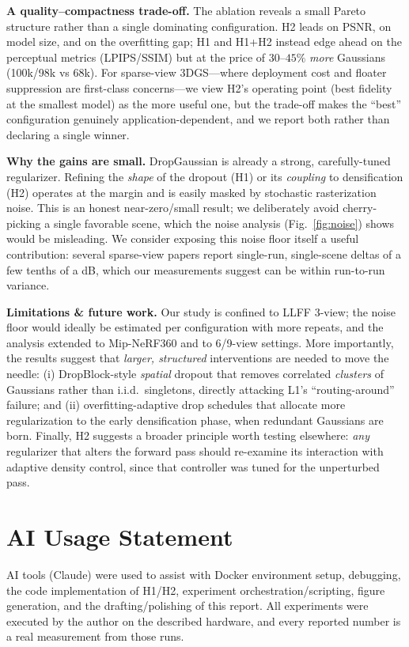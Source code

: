 \documentclass[conference]{IEEEtran}
\begin{document}
\textbf{A quality--compactness trade-off.} The ablation reveals a small Pareto
structure rather than a single dominating configuration. H2 leads on PSNR, on model
size, and on the overfitting gap; H1 and H1+H2 instead edge ahead on the perceptual
metrics (LPIPS/SSIM) but at the price of $30$--$45\%$ \emph{more} Gaussians (100k/98k vs
68k). For sparse-view 3DGS---where deployment cost and floater suppression are first-class
concerns---we view H2's operating point (best fidelity at the smallest model) as the more
useful one, but the trade-off makes the ``best'' configuration genuinely
application-dependent, and we report both rather than declaring a single winner.

\textbf{Why the gains are small.} DropGaussian is already a strong, carefully-tuned
regularizer. Refining the \emph{shape} of the dropout (H1) or its \emph{coupling} to
densification (H2) operates at the margin and is easily masked by stochastic
rasterization noise. This is an honest near-zero/small result; we deliberately avoid
cherry-picking a single favorable scene, which the noise analysis (Fig.~\ref{fig:noise})
shows would be misleading. We consider exposing this noise floor itself a useful
contribution: several sparse-view papers report single-run, single-scene deltas of a
few tenths of a dB, which our measurements suggest can be within run-to-run variance.

\textbf{Limitations \& future work.} Our study is confined to LLFF 3-view; the noise
floor would ideally be estimated per configuration with more repeats, and the analysis
extended to Mip-NeRF360 and to 6/9-view settings. More importantly, the results suggest
that \emph{larger, structured} interventions are needed to move the needle: (i)
DropBlock-style \emph{spatial} dropout that removes correlated \emph{clusters} of
Gaussians rather than i.i.d.\ singletons, directly attacking L1's ``routing-around''
failure; and (ii) overfitting-adaptive drop schedules that allocate more regularization
to the early densification phase, when redundant Gaussians are born. Finally, H2
suggests a broader principle worth testing elsewhere: \emph{any} regularizer that
alters the forward pass should re-examine its interaction with adaptive density
control, since that controller was tuned for the unperturbed pass.

\section*{AI Usage Statement}
AI tools (Claude) were used to assist with Docker environment setup, debugging, the
code implementation of H1/H2, experiment orchestration/scripting, figure generation,
and the drafting/polishing of this report. All experiments were executed by the author
on the described hardware, and every reported number is a real measurement from those
runs.
\end{document}
